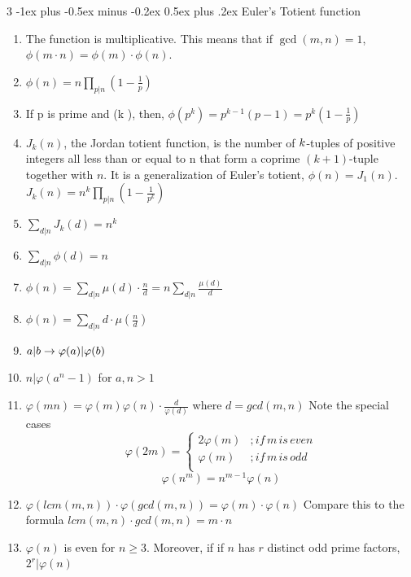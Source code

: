 \documentclass[8pt,a4paper,onesided]{article}
\makeatletter
\renewcommand{\subsection}{\@startsection{subsection}{2}{0mm}
    {-1ex plus -0.5ex minus -0.2ex} %
    {0.5ex plus .2ex}                %
    {\normalfont\large\bfseries}}    %
\makeatother
\begin{document}
\begin{multicols}{3}
\subsection{Euler’s Totient function}
\begin{enumerate}[resume]
    \item The function is multiplicative.
    This means that if $\displaystyle \gcd(m, n) = 1$, $\displaystyle \phi(m \cdot n) = \phi(m) \cdot \phi(n)$.
    \item $\displaystyle \phi(n) = n\prod_{p |n}(1 - \frac{1}{p} )$
    \item If p is prime and (k ), then,
    $\displaystyle \phi(p^k) = p^{k - 1}(p - 1) = p^k(1 - \frac{1}{p})$
    \item $J_k(n)$, the Jordan totient function, is the number of $\displaystyle \displaystyle k$-tuples of positive integers all less than or equal to n that form a coprime $\displaystyle (k + 1)$-tuple together with $n$. It is a generalization of Euler’s totient, $\displaystyle \phi(n) = J_1(n)$.
    \(J_k(n) = n^k\prod_{p |n}(1 - \frac{1}{p^k})\)
    \item $\displaystyle \sum_{d|n}J_k(d) = n^k$
    \item $\displaystyle \sum_{d|n}\phi(d) = n$
    \item $\displaystyle \phi(n) = \sum_{d|n}\mu(d)\cdot\frac{n}{d} = n\sum_{d|n}\frac{\mu(d)}{d}$
    \item $\displaystyle \phi(n) = \sum_{d|n}d\cdot\mu(\frac{n}{d})$
    \item $\displaystyle \displaystyle {a}\vert{b} \to \varphi(a)\vert{\varphi(b)}$
    \item $n\vert{\varphi(a^n - 1)}$ for $\displaystyle a, n > 1$
    \item $\displaystyle \varphi(mn)=\varphi(m)\varphi(n)\cdot\frac{d}{\varphi(d)}$ where $d=gcd(m, n)$
    Note the special cases
    \[\varphi(2m)=
    \begin{cases}
      2\varphi(m) & ; if \, m  \, is \, even\\
      \varphi(m) & ; if \, m \, is \, odd\\
    \end{cases}\]
    \[\displaystyle \varphi(n^m)=n^{m-1}\varphi(n)\]
    \item $\displaystyle \varphi(lcm(m, n)) \cdot \varphi(gcd(m, n))=\varphi(m) \cdot \varphi(n)$
    Compare this to the formula $lcm(m, n)\cdot gcd(m,n)=m\cdot n$
    \item $\displaystyle \varphi(n)$ is even for $n\geq3$. Moreover, if if $n$ has $r$ distinct odd prime factors, $\displaystyle 2^r \vert \varphi(n)$

\end{enumerate}
\end{multicols}
\end{document}

